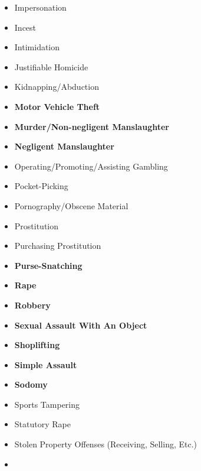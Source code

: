 \documentclass[
]{krantz}
\begin{document}
\begin{itemize}
\item
  Impersonation\\
\item
  Incest\\
\item
  Intimidation\\
\item
  Justifiable Homicide\\
\item
  Kidnapping/Abduction\\
\item
  \textbf{Motor Vehicle Theft}\\
\item
  \textbf{Murder/Non-negligent Manslaughter}\\
\item
  \textbf{Negligent Manslaughter}\\
\item
  Operating/Promoting/Assisting Gambling\\
\item
  Pocket-Picking\\
\item
  Pornography/Obscene Material\\
\item
  Prostitution\\
\item
  Purchasing Prostitution\\
\item
  \textbf{Purse-Snatching}\\
\item
  \textbf{Rape}\\
\item
  \textbf{Robbery}\\
\item
  \textbf{Sexual Assault With An Object}\\
\item
  \textbf{Shoplifting}\\
\item
  \textbf{Simple Assault}\\
\item
  \textbf{Sodomy}\\
\item
  Sports Tampering\\
\item
  Statutory Rape\\
\item
  Stolen Property Offenses (Receiving, Selling, Etc.)
\item

\end{itemize}
\end{document}
